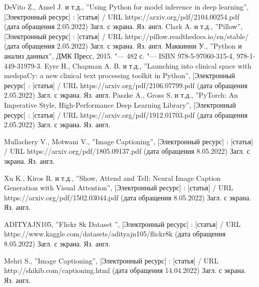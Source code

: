 \documentclass[bachelor, och, coursework]{SCWorks}
\begin{document}
\begin{thebibliography}{99}
     DeVito Z., Ansel J. и т.д., ''Using Python for model
    inference in deep learning'', [Электронный ресурс] : [статья] / URL
    https://arxiv.org/pdf/2104.00254.pdf (дата обращения 2.05.2022) Загл. с
    экрана. Яз. англ.
     Clark A. и т.д., ''Pillow'', [Электронный ресурс] : [статья] /
    URL https://pillow.readthedocs.io/en/stable/ (дата обращения 2.05.2022)
    Загл. с экрана. Яз. англ.
     Маккинни У., ''Python и анализ данных'', ДМК Пресс, 2015.
    "--- 482 с. "--- ISBN 978-5-97060-315-4, 978-1-449-31979-3.
     Eyre H., Chapman A. B. и т.д., ''Launching into clinical
    space with medspaCy: a new clinical text processing toolkit in Python'',
    [Электронный ресурс] : [статья] / URL https://arxiv.org/pdf/2106.07799.pdf
    (дата обращения 2.05.2022) Загл. с экрана. Яз. англ.
     Paszke A., Gross S. и т.д., ''PyTorch: An Imperative
    Style, High-Performance Deep Learning Library'', [Электронный ресурс] :
    [статья] / URL https://arxiv.org/pdf/1912.01703.pdf (дата обращения
    2.05.2022) Загл. с экрана. Яз. англ.

     Mullachery V., Motwani V., ''Image Captioning'',
    [Электронный ресурс] : [статья] / URL https://arxiv.org/pdf/1805.09137.pdf
    (дата обращения 8.05.2022) Загл. с экрана. Яз. англ.

     Xu K., Kiros R. и т.д., ''Show, Attend and Tell: Neural
    Image Caption Generation with Visual Attention'', [Электронный ресурс] :
    [статья] / URL https://arxiv.org/pdf/1502.03044.pdf (дата обращения
    8.05.2022) Загл. с экрана. Яз. англ.

     ADITYAJN105, ''Flickr 8k Dataset '', [Электронный ресурс]
    : [статья] / URL https://www.kaggle.com/datasets/adityajn105/flickr8k (дата
    обращения 8.05.2022) Загл. с экрана. Яз. англ.


    
     Mehri S., ''Image Captioning'', [Электронный ресурс]
    : [статья] / URL http://shikib.com/captioning.html (дата обращения
    14.04.2022) Загл. с экрана. Яз. англ.


\end{thebibliography}
\end{document}
